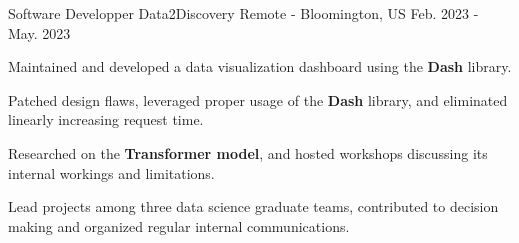\begin{cventries}
  \cventry
    {Software Developper} %
    {Data2Discovery} %
    {Remote - Bloomington, US} %
    {Feb. 2023 - May. 2023} %
    {
      \begin{cvitems} %
        \item {Maintained and developed a data visualization dashboard using the \textbf{Dash} library.}
        \item {Patched design flaws, leveraged proper usage of the \textbf{Dash} library, and eliminated linearly increasing request time.}
        \item {Researched on the \textbf{Transformer model}, and hosted workshops discussing its internal workings and limitations.}
        \item {Lead projects among three data science graduate teams, contributed to decision making and organized regular internal communications.}
      \end{cvitems}
    }

\end{cventries}
